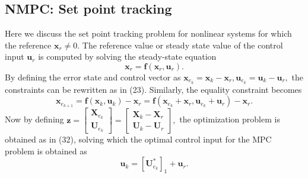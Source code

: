 \documentclass{article}
\begin{document}
\subsection{NMPC: Set point tracking}
Here we discuss the set point tracking problem for nonlinear systems for which the reference $\textbf{x}_{r}\neq 0$. The reference value or steady state value of the control input $\textbf{u}_{r}$ is computed by solving the steady-state equation
\begin{equation}
    \textbf{x}_{r}=\textbf{f}(\textbf{x}_{r},\textbf{u}_{r}).
\end{equation}
By defining the error state and control vector as $\textbf{x}_{e_k}=\textbf{x}_{k}-\textbf{x}_{r}, \textbf{u}_{e_k}=\textbf{u}_{k}-\textbf{u}_{r},$ the constraints can be rewritten as in (23). Similarly, the equality constraint  becomes
\begin{equation}
    \textbf{x}_{e_{k+1}}=\textbf{f}(\textbf{x}_{k},\textbf{u}_{k})-\textbf{x}_{r}=\textbf{f}(\textbf{x}_{e_k}+\textbf{x}_{r},\textbf{u}_{e_k}+\textbf{u}_{r})-\textbf{x}_{r}.
\end{equation}
Now by defining $\textbf{z}=\left[\begin{matrix} \textbf{X}_{e_k}\\ \textbf{U}_{e_k} \end{matrix}\right]=\left[ \begin{matrix} \textbf{X}_{k}-\textbf{X}_{r} \\\textbf{U}_{k}-\textbf{U}_{r} \end{matrix}\right],$ the optimization problem is obtained as in (32), solving which the optimal control input for the MPC problem is obtained as
\begin{equation}
    \textbf{u}_{k}=[\textbf{U}_{e_k}^{*}]_{1}+\textbf{u}_{r}.
\end{equation}
\end{document}
